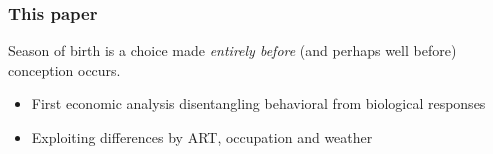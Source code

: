 \documentclass[10pt,letterpaper,subeqn]{beamer}
\begin{document}

\begin{frame}
\frametitle{This paper}
Season of birth is a choice made \emph{entirely before} (and perhaps well before) conception occurs.
\vspace{4mm}
\begin{itemize}
\item First economic analysis disentangling behavioral from biological responses
\item Exploiting differences by ART, occupation and weather
\end{itemize}
\end{frame}
\end{document}
